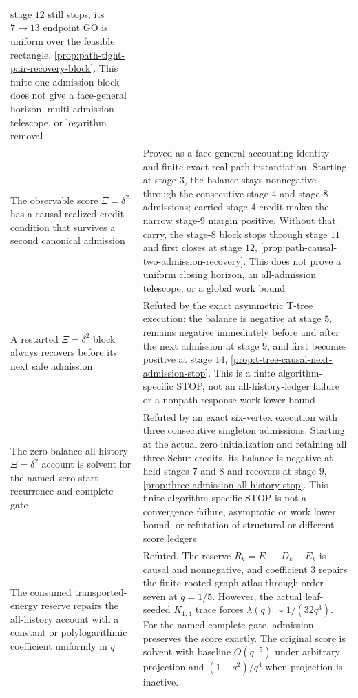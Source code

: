 \begin{center}
\begin{tabularx}{\textwidth}{@{}X p{}@{}}
stage $12$ still stops; its $7\to13$ endpoint GO is uniform over the feasible
rectangle,
\cref{prop:path-tight-pair-recovery-block}.  This finite one-admission block
does not give a face-general horizon, multi-admission telescope, or logarithm
removal \\
The observable score $\Xi=\delta^2$ has a causal realized-credit condition
that survives a second canonical admission & Proved as a face-general
accounting identity and finite exact-real path instantiation.  Starting at
stage $3$, the balance stays nonnegative through the consecutive stage-$4$
and stage-$8$ admissions; carried stage-$4$ credit makes the narrow stage-$9$
margin positive.  Without that carry, the stage-$8$ block stops through stage
$11$ and first closes at stage $12$,
\cref{prop:path-causal-two-admission-recovery}.  This does not prove a uniform
closing horizon, an all-admission telescope, or a global work bound \\
A restarted $\Xi=\delta^2$ block always recovers before its next safe
admission & Refuted by the exact asymmetric T-tree execution: the balance is
negative at stage $5$, remains negative immediately before and after the next
admission at stage $9$, and first becomes positive at stage $14$,
\cref{prop:t-tree-causal-next-admission-stop}.  This is a finite
algorithm-specific STOP, not an all-history-ledger failure or a nonpath
response-work lower bound \\
The zero-balance all-history $\Xi=\delta^2$ account is solvent for the named
zero-start recurrence and complete gate & Refuted by an exact six-vertex
execution with three consecutive singleton admissions.  Starting at the
actual zero initialization and retaining all three Schur credits, its balance
is negative at held stages $7$ and $8$ and recovers at stage $9$,
\cref{prop:three-admission-all-history-stop}.  This finite algorithm-specific
STOP is not a convergence failure, asymptotic or work lower bound, or
refutation of structural or different-score ledgers \\
The consumed transported-energy reserve repairs the all-history account with
a constant or polylogarithmic coefficient uniformly in $q$ & Refuted.  The
reserve $R_k=E_0+D_k-E_k$ is causal and nonnegative, and coefficient $3$
repairs the finite rooted graph atlas through order seven at $q=1/5$.
However, the actual leaf-seeded $K_{1,4}$ trace forces
$\lambda(q)\sim1/(32q^3)$.  For the named complete gate, admission preserves
the score exactly.  The original score is solvent with baseline $O(q^{-5})$
under arbitrary projection and $(1-q^2)/q^4$ when projection is inactive.

\end{tabularx}
\end{center}
